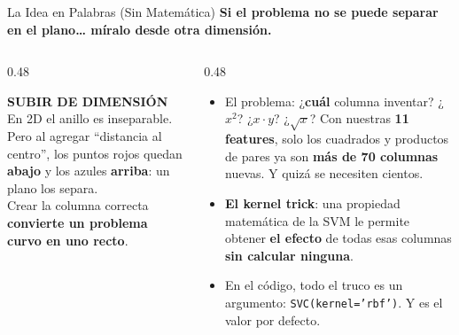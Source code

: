 \documentclass[aspectratio=169, 11pt]{beamer}
\begin{document}
\begin{frame}[shrink=8]{La Idea en Palabras (Sin Matemática)}
  \vspace{-4pt}
  {\small\color{arcaDark}\bfseries
    Si el problema no se puede separar en el plano\ldots{} míralo desde otra dimensión.}

  \vspace{8pt}
  \begin{columns}[T]
    \begin{column}{0.48\textwidth}
      \begin{tcolorbox}[colback=arcaGray, colframe=arcaRed, boxrule=0pt, leftrule=3pt,
        arc=3pt, left=6pt, right=6pt, top=5pt, bottom=5pt]
        {\scriptsize\color{arcaRed}\bfseries\faLayerGroup\hspace{4pt}SUBIR DE DIMENSIÓN}\\[4pt]
        {\scriptsize\color{textMuted}
          En 2D el anillo es inseparable. Pero al agregar
          ``distancia al centro'', los puntos rojos quedan
          \textbf{abajo} y los azules \textbf{arriba}: un plano
          los separa.\\[3pt]
          Crear la columna correcta \textbf{convierte un problema
          curvo en uno recto}.}
      \end{tcolorbox}
    \end{column}
    \begin{column}{0.48\textwidth}
      {\footnotesize\color{textMuted}
      \begin{itemize}\setlength{\itemsep}{5pt}
        \item[{\color{arcaRed}\scriptsize\faExclamationTriangle}]
          El problema: ¿\textbf{cuál} columna inventar? ¿\(x^2\)?
          ¿\(x \cdot y\)? ¿\(\sqrt{x}\)? Con nuestras \textbf{11 features},
          solo los cuadrados y productos de pares ya son
          \textbf{más de 70 columnas} nuevas. Y quizá se necesiten cientos.
        \item[{\color{arcaRed}\scriptsize\faBolt}]
          \textbf{El kernel trick}: una propiedad matemática de la SVM
          le permite obtener \textbf{el efecto} de todas esas columnas
          \textbf{sin calcular ninguna}.
        \item[{\color{codeGreen}\scriptsize\faCheck}]
          En el código, todo el truco es un argumento:
          \texttt{SVC(kernel='rbf')}. Y es el valor por defecto.
      \end{itemize}
      }
    \end{column}
  \end{columns}
\end{frame}
\end{document}
